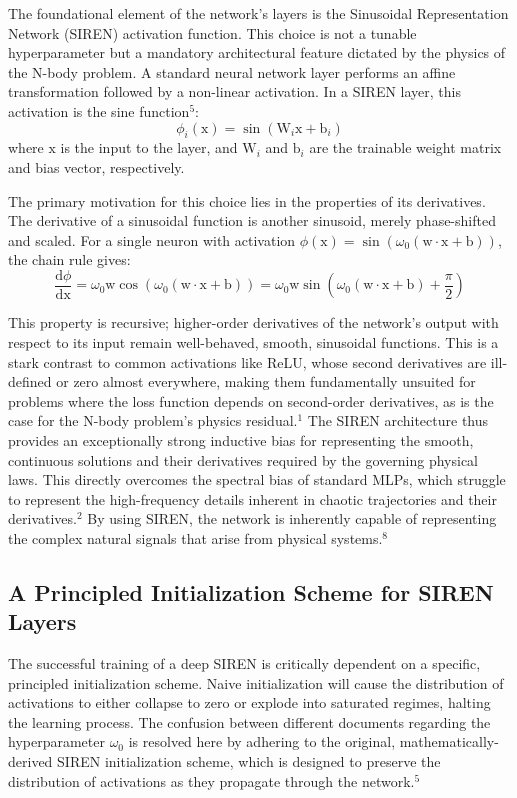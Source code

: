 \documentclass{article}
\begin{document}
The foundational element of the network's layers is the Sinusoidal Representation Network (SIREN) activation function. This choice is not a tunable hyperparameter but a mandatory architectural feature dictated by the physics of the $\mathrm{N}$-body problem. A standard neural network layer performs an affine transformation followed by a non-linear activation. In a SIREN layer, this activation is the sine function$^5$:
\[
\phi_i(\mathrm{x}) = \sin(\mathrm{W}_i \mathrm{x} + \mathrm{b}_i)
\]
where $\mathrm{x}$ is the input to the layer, and $\mathrm{W}_i$ and $\mathrm{b}_i$ are the trainable weight matrix and bias vector, respectively.

The primary motivation for this choice lies in the properties of its derivatives. The derivative of a sinusoidal function is another sinusoid, merely phase-shifted and scaled. For a single neuron with activation $\phi(\mathrm{x}) = \sin(\omega_0 (\mathrm{w} \cdot \mathrm{x} + \mathrm{b}))$, the chain rule gives:
\[
\frac{\mathrm{d} \phi}{\mathrm{d} \mathrm{x}} = \omega_0 \mathrm{w} \cos(\omega_0 (\mathrm{w} \cdot \mathrm{x} + \mathrm{b})) = \omega_0 \mathrm{w} \sin(\omega_0 (\mathrm{w} \cdot \mathrm{x} + \mathrm{b}) + \frac{\pi}{2})
\]

This property is recursive; higher-order derivatives of the network's output with respect to its input remain well-behaved, smooth, sinusoidal functions. This is a stark contrast to common activations like ReLU, whose second derivatives are ill-defined or zero almost everywhere, making them fundamentally unsuited for problems where the loss function depends on second-order derivatives, as is the case for the $\mathrm{N}$-body problem's physics residual.$^1$ The SIREN architecture thus provides an exceptionally strong inductive bias for representing the smooth, continuous solutions and their derivatives required by the governing physical laws. This directly overcomes the spectral bias of standard MLPs, which struggle to represent the high-frequency details inherent in chaotic trajectories and their derivatives.$^2$ By using SIREN, the network is inherently capable of representing the complex natural signals that arise from physical systems.$^8$

\subsection{A Principled Initialization Scheme for SIREN Layers}

The successful training of a deep SIREN is critically dependent on a specific, principled initialization scheme. Naive initialization will cause the distribution of activations to either collapse to zero or explode into saturated regimes, halting the learning process. The confusion between different documents regarding the hyperparameter $\omega_0$ is resolved here by adhering to the original, mathematically-derived SIREN initialization scheme, which is designed to preserve the distribution of activations as they propagate through the network.$^5$
\end{document}
